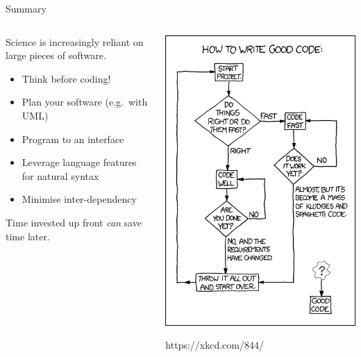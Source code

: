 \documentclass[12pt]{beamer}
\begin{document}
\begin{frame}{Summary}
  \begin{columns}
    \begin{column}{0.6\textwidth}
      Science is increasingly reliant on large pieces of
      software.
      
      \begin{itemize}
      \item Think before coding!
      \item Plan your software (e.g.\ with UML)
      \item Program to an interface
      \item Leverage language features for natural syntax
      \item Minimise inter-dependency
      \end{itemize}
      
      Time invested up front \textit{can} save time later.
    \end{column}
    \begin{column}{0.4\textwidth}
      \includegraphics[width=\textwidth]{good_code.png}

      \vspace{-3mm}
      {\tiny https://xkcd.com/844/}
    \end{column}
  \end{columns}
\end{frame}
\end{document}
